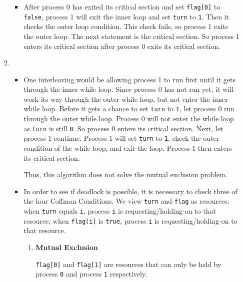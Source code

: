\documentclass[12pt,letterpaper]{article}
\begin{document}
\begin{enumerate}
\begin{enumerate}
\begin{itemize}
            \item
              After process 0 has exited its critical section and set \texttt{flag[0]} to \texttt{false},
              process 1 will exit the inner loop and set \texttt{turn} to \texttt{1}.
              Then it checks the outer loop condition.
              This check fails, so process 1 exits the outer loop.
              The next statement is the critical section.
              So process 1 enters its critical section after process 0 exits its critical section.
          \end{itemize}
        \item
          \begin{itemize}
            \item
              One interleaving would be allowing process 1 to run first until it gets through the inner while loop.
              Since process 0 has not run yet,
              it will work its way through the outer while loop, but not enter the inner while loop.
              Before it gets a chance to set \texttt{turn} to \texttt{1},
              let process 0 run through the outer while loop.
              Process 0 will not enter the while loop as \texttt{turn} is still \texttt{0}.
              So process 0 enters its critical section.
              Next, let process 1 continue.
              Process 1 will set \texttt{turn} to \texttt{1},
              check the outer condition of the while loop, and exit the loop.
              Process 1 then enters its critical section.

              Thus, this algorithm does not solve the mutual exclusion problem.
            \item
              In order to see if deadlock is possible,
              it is necessary to check three of the four Coffman Conditions.
              We view \texttt{turn} and \texttt{flag} as resources:
              when \texttt{turn} equals \texttt{i}, process \texttt{i} is requesting/holding-on to that resource;
              when \texttt{flag[i]} is \texttt{true}, process \texttt{i} is requesting/holding-on to that resource.

              \begin{enumerate}
                \item
                  \textbf{Mutual Exclusion}

                  \texttt{flag[0]} and \texttt{flag[1]}
                  are resources that can only be held by
                  process \texttt{0} and process \texttt{1} respectively.


\end{enumerate}
\end{itemize}
\end{enumerate}
\end{enumerate}
\end{document}
